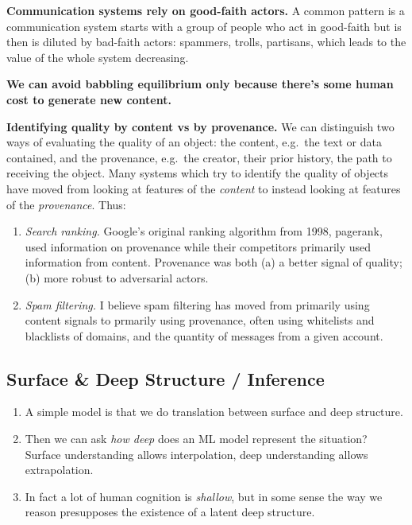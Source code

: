\documentclass[
  11pt,
  letterpaper,
  DIV=11,
  numbers=noendperiod,
  oneside]{scrartcl}
\begin{document}
\textbf{Communication systems rely on good-faith actors.} A common
pattern is a communication system starts with a group of people who act
in good-faith but is then is diluted by bad-faith actors: spammers,
trolls, partisans, which leads to the value of the whole system
decreasing.

\textbf{We can avoid babbling equilibrium only because there's some
human cost to generate new content.}

\textbf{Identifying quality by content vs by provenance.} We can
distinguish two ways of evaluating the quality of an object: the
content, e.g.~the text or data contained, and the provenance, e.g.~the
creator, their prior history, the path to receiving the object. Many
systems which try to identify the quality of objects have moved from
looking at features of the \emph{content} to instead looking at features
of the \emph{provenance}. Thus:

\begin{enumerate}
\def\labelenumi{\arabic{enumi}.}
\item
  \emph{Search ranking.} Google's original ranking algorithm from 1998,
  pagerank, used information on provenance while their competitors
  primarily used information from content. Provenance was both (a) a
  better signal of quality; (b) more robust to adversarial
  actors.
\item
  \emph{Spam filtering.} I believe spam filtering has moved from
  primarily using content signals to prmarily using provenance, often
  using whitelists and blacklists of domains, and the quantity of
  messages from a given account.
\end{enumerate}

\hypertarget{surface-deep-structure-inference}{%
\subsection{Surface \& Deep Structure /
Inference}\label{surface-deep-structure-inference}}

\begin{enumerate}
\def\labelenumi{\arabic{enumi}.}
\item
  A simple model is that we do translation between surface and deep
  structure.
\item
  Then we can ask \emph{how deep} does an ML model represent the
  situation? Surface understanding allows interpolation, deep
  understanding allows extrapolation.
\item
  In fact a lot of human cognition is \emph{shallow}, but in some sense
  the way we reason presupposes the existence of a latent deep
  structure.
\end{enumerate}
\end{document}

